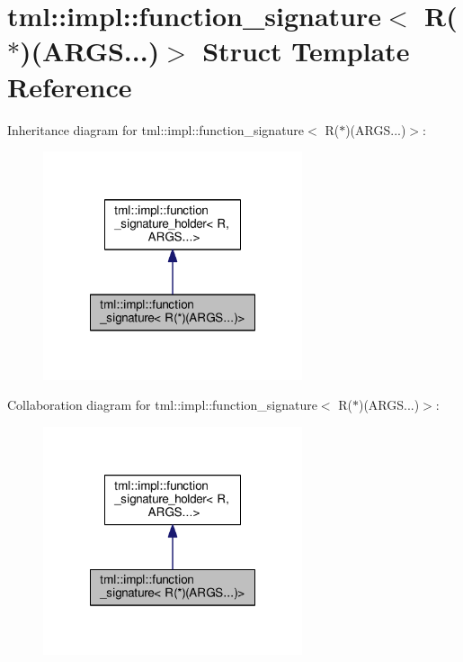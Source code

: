 \hypertarget{structtml_1_1impl_1_1function__signature_3_01_r_07_5_08_07_a_r_g_s_8_8_8_08_4}{\section{tml\+:\+:impl\+:\+:function\+\_\+signature$<$ R($\ast$)(A\+R\+G\+S...)$>$ Struct Template Reference}
\label{structtml_1_1impl_1_1function__signature_3_01_r_07_5_08_07_a_r_g_s_8_8_8_08_4}
}


Inheritance diagram for tml\+:\+:impl\+:\+:function\+\_\+signature$<$ R($\ast$)(A\+R\+G\+S...)$>$\+:
\nopagebreak
\begin{figure}[H]
\begin{center}
\leavevmode
\includegraphics[width=216pt]{structtml_1_1impl_1_1function__signature_3_01_r_07_5_08_07_a_r_g_s_8_8_8_08_4__inherit__graph}
\end{center}
\end{figure}


Collaboration diagram for tml\+:\+:impl\+:\+:function\+\_\+signature$<$ R($\ast$)(A\+R\+G\+S...)$>$\+:
\nopagebreak
\begin{figure}[H]
\begin{center}
\leavevmode
\includegraphics[width=216pt]{structtml_1_1impl_1_1function__signature_3_01_r_07_5_08_07_a_r_g_s_8_8_8_08_4__coll__graph}
\end{center}
\end{figure}
